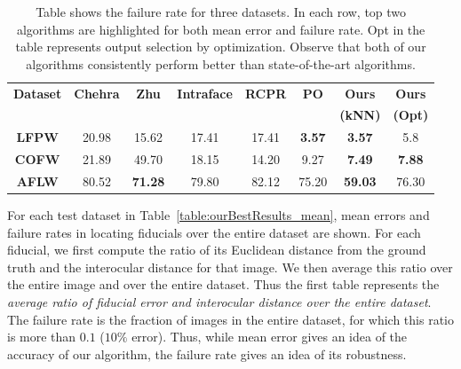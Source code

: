 \begin{table}%
   \centering
   \begin{tabular}{c c c c c c c c}
    \toprule[1.5pt]
     {\bf Dataset} & {\bf Chehra} & {\bf Zhu} & {\bf Intraface} & {\bf RCPR} & {\bf PO} & {\bf Ours} & {\bf Ours }\\
     & & & & & & \bf(kNN) & \bf(Opt) \\%
    \midrule
    {\bf LFPW} &  20.98 & 15.62 & 17.41 & 17.41 & {\bf 3.57} &{\bf 3.57} & 5.8 \\ 
    {\bf COFW} &  21.89 & 49.70 & 18.15 & 14.20 & 9.27 &{\bf 7.49 } & {\bf 7.88} \\
    {\bf AFLW} &  80.52 & {\bf 71.28} & 79.80 & 82.12 & 75.20 & {\bf 59.03} & 76.30  \\ 
    \bottomrule[1.5pt]

    \end{tabular}
    \caption{Table shows the failure rate for three datasets. In each row, top two algorithms are highlighted for both mean error and failure rate. Opt in the table represents output selection by optimization. Observe that both of our algorithms consistently perform better than state-of-the-art algorithms. }
    \label{table:ourBestResults_fail}
\end{table}

For each test dataset in Table~\ref{table:ourBestResults_mean}, 
mean errors and failure rates in locating fiducials over the entire dataset are shown. For each fiducial, we first compute
the ratio of its Euclidean distance from the ground truth and the interocular distance for that
image. We then average this ratio over the entire image and over the entire dataset. Thus the first
table represents the \emph{average ratio of fiducial error and interocular distance over the entire
dataset}. The failure rate is the
fraction of images in the entire dataset, for which this ratio is more than $0.1$ 
($10 \%$ error). Thus, while mean error gives an idea of the accuracy of our algorithm, the
failure rate gives an idea of its robustness. 
 
